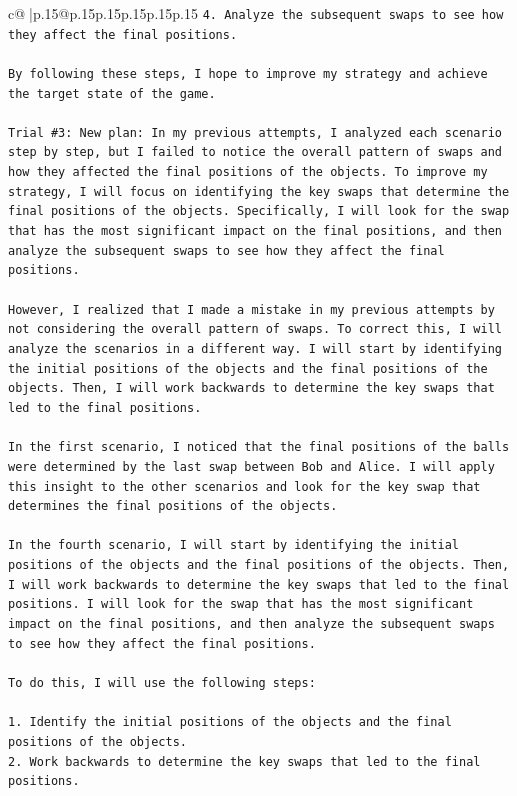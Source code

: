 \documentclass{article}
\begin{document}
{\begin{supertabular}{c@{$\;$}|p{.15\linewidth}@{}p{.15\linewidth}p{.15\linewidth}p{.15\linewidth}p{.15\linewidth}p{.15\linewidth}}
{{{\texttt{4. Analyze the subsequent swaps to see how they affect the final positions.} \\
\\ 
\texttt{By following these steps, I hope to improve my strategy and achieve the target state of the game.} \\
\\ 
\texttt{Trial \#3: New plan: In my previous attempts, I analyzed each scenario step by step, but I failed to notice the overall pattern of swaps and how they affected the final positions of the objects. To improve my strategy, I will focus on identifying the key swaps that determine the final positions of the objects. Specifically, I will look for the swap that has the most significant impact on the final positions, and then analyze the subsequent swaps to see how they affect the final positions.} \\
\\ 
\texttt{However, I realized that I made a mistake in my previous attempts by not considering the overall pattern of swaps. To correct this, I will analyze the scenarios in a different way. I will start by identifying the initial positions of the objects and the final positions of the objects. Then, I will work backwards to determine the key swaps that led to the final positions.} \\
\\ 
\texttt{In the first scenario, I noticed that the final positions of the balls were determined by the last swap between Bob and Alice. I will apply this insight to the other scenarios and look for the key swap that determines the final positions of the objects.} \\
\\ 
\texttt{In the fourth scenario, I will start by identifying the initial positions of the objects and the final positions of the objects. Then, I will work backwards to determine the key swaps that led to the final positions. I will look for the swap that has the most significant impact on the final positions, and then analyze the subsequent swaps to see how they affect the final positions.} \\
\\ 
\texttt{To do this, I will use the following steps:} \\
\\ 
\texttt{1. Identify the initial positions of the objects and the final positions of the objects.} \\
\texttt{2. Work backwards to determine the key swaps that led to the final positions.} \\
}}}
\end{supertabular}}
\end{document}
